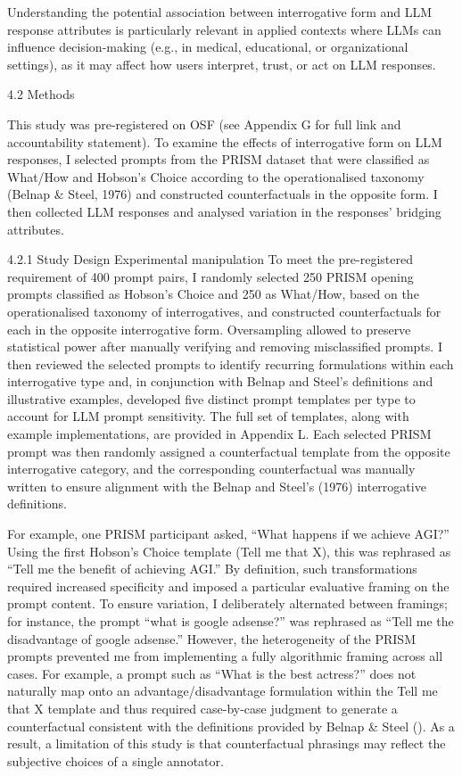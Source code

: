 \documentclass[
  12pt,
]{article}
\begin{document}
Understanding the potential association between interrogative form and LLM response attributes is particularly relevant in applied contexts where LLMs can influence decision-making (e.g., in medical, educational, or organizational settings), as it may affect how users interpret, trust, or act on LLM responses.

4.2 Methods

This study was pre-registered on OSF (see Appendix G for full link and accountability statement). To examine the effects of interrogative form on LLM responses, I selected prompts from the PRISM dataset that were classified as What/How and Hobson's Choice according to the operationalised taxonomy (Belnap \& Steel, 1976) and constructed counterfactuals in the opposite form. I then collected LLM responses and analysed variation in the responses' bridging attributes.

4.2.1 Study Design
Experimental manipulation
To meet the pre-registered requirement of 400 prompt pairs, I randomly selected 250 PRISM opening prompts classified as Hobson's Choice and 250 as What/How, based on the operationalised taxonomy of interrogatives, and constructed counterfactuals for each in the opposite interrogative form. Oversampling allowed to preserve statistical power after manually verifying and removing misclassified prompts. I then reviewed the selected prompts to identify recurring formulations within each interrogative type and, in conjunction with Belnap and Steel's definitions and illustrative examples, developed five distinct prompt templates per type to account for LLM prompt sensitivity. The full set of templates, along with example implementations, are provided in Appendix L. Each selected PRISM prompt was then randomly assigned a counterfactual template from the opposite interrogative category, and the corresponding counterfactual was manually written to ensure alignment with the Belnap and Steel's (1976) interrogative definitions.

For example, one PRISM participant asked, ``What happens if we achieve AGI?'' Using the first Hobson's Choice template (Tell me that X), this was rephrased as ``Tell me the benefit of achieving AGI.'' By definition, such transformations required increased specificity and imposed a particular evaluative framing on the prompt content. To ensure variation, I deliberately alternated between framings; for instance, the prompt ``what is google adsense?'' was rephrased as ``Tell me the disadvantage of google adsense.'' However, the heterogeneity of the PRISM prompts prevented me from implementing a fully algorithmic framing across all cases. For example, a prompt such as ``What is the best actress?'' does not naturally map onto an advantage/disadvantage formulation within the Tell me that X template and thus required case-by-case judgment to generate a counterfactual consistent with the definitions provided by Belnap \& Steel (). As a result, a limitation of this study is that counterfactual phrasings may reflect the subjective choices of a single annotator.
\end{document}
